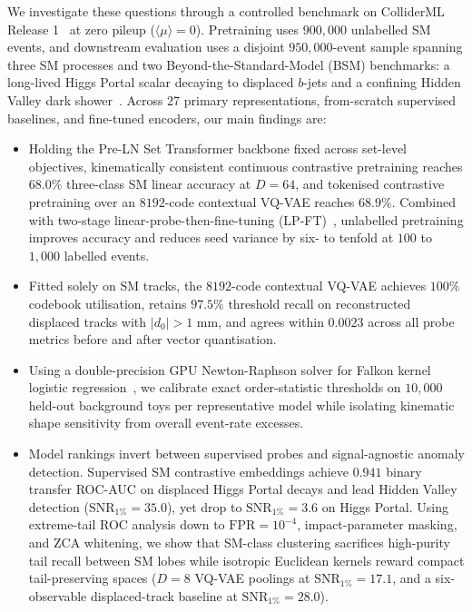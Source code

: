 \documentclass{article}
\begin{document}
We investigate these questions through a controlled benchmark on ColliderML Release 1~\cite{ColliderML,ColliderMLDataset} at zero pileup ($\langle\mu\rangle = 0$). Pretraining uses $900,000$ unlabelled SM events, and downstream evaluation uses a disjoint $950,000$-event sample spanning three SM processes and two Beyond-the-Standard-Model (BSM) benchmarks: a long-lived Higgs Portal scalar decaying to displaced $b$-jets and a confining Hidden Valley dark shower~\cite{StrasslerZurek2007}. Across 27 primary representations, from-scratch supervised baselines, and fine-tuned encoders, our main findings are:
\begin{itemize}
    \item Holding the Pre-LN Set Transformer backbone fixed across set-level objectives, kinematically consistent continuous contrastive pretraining reaches $68.0\%$ three-class SM linear accuracy at $D=64$, and tokenised contrastive pretraining over an $8192$-code contextual VQ-VAE reaches $68.9\%$. Combined with two-stage linear-probe-then-fine-tuning (LP-FT)~\cite{LPFT2022}, unlabelled pretraining improves accuracy and reduces seed variance by six- to tenfold at $100$ to $1,000$ labelled events.
    \item Fitted solely on SM tracks, the $8192$-code contextual VQ-VAE achieves $100\%$ codebook utilisation, retains $97.5\%$ threshold recall on reconstructed displaced tracks with $|d_0| > 1\text{ mm}$, and agrees within $0.0023$ across all probe metrics before and after vector quantisation.
    \item Using a double-precision GPU Newton-Raphson solver for Falkon kernel logistic regression~\cite{KernelNPLM2022}, we calibrate exact order-statistic thresholds on $10,000$ held-out background toys per representative model while isolating kinematic shape sensitivity from overall event-rate excesses.
    \item Model rankings invert between supervised probes and signal-agnostic anomaly detection. Supervised SM contrastive embeddings achieve $0.941$ binary transfer ROC-AUC on displaced Higgs Portal decays and lead Hidden Valley detection ($\text{SNR}_{1\%} = 35.0$), yet drop to $\text{SNR}_{1\%} = 3.6$ on Higgs Portal. Using extreme-tail ROC analysis down to $\text{FPR} = 10^{-4}$, impact-parameter masking, and ZCA whitening, we show that SM-class clustering sacrifices high-purity tail recall between SM lobes while isotropic Euclidean kernels reward compact tail-preserving spaces ($D=8$ VQ-VAE poolings at $\text{SNR}_{1\%} = 17.1$, and a six-observable displaced-track baseline at $\text{SNR}_{1\%} = 28.0$).
\end{itemize}
\end{document}
